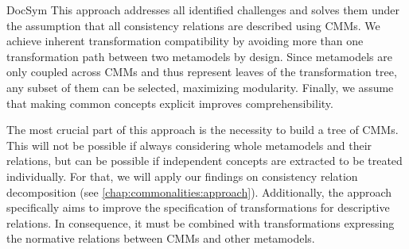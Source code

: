 \begin{copiedFrom}{DocSym}
This approach addresses all identified challenges %
and solves them under the assumption that all consistency relations %
are described using \acp{CMM}. %
We achieve inherent transformation compatibility by avoiding more than one transformation path %
between two metamodels by design. %
Since metamodels are only coupled across \acp{CMM} and thus represent leaves of the transformation tree, any subset of them can be selected, maximizing modularity. %
Finally, we assume that making common concepts explicit improves comprehensibility.

The most crucial part of this approach is the necessity to build a tree of \acp{CMM}.
This will not be possible if always considering whole metamodels and their relations, but can be possible if independent concepts are extracted to be treated individually.
For that, we will apply our findings on consistency relation decomposition (see \autoref{chap:commonalities:approach}).
Additionally, the approach specifically aims to improve the specification of transformations for descriptive relations.
In consequence, it must be combined with transformations expressing the normative relations between \acp{CMM} and other metamodels.


\end{copiedFrom}
